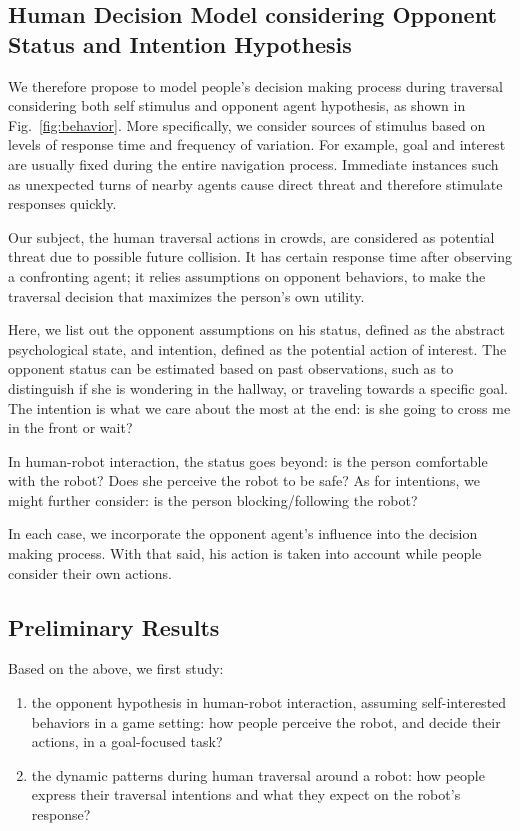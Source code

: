 \documentclass[conference]{IEEEtran}
\begin{document}
\subsection{Human Decision Model considering Opponent Status and Intention Hypothesis}
We therefore propose to model people's decision making process during 
traversal considering both self stimulus and opponent agent hypothesis, as 
shown in Fig.~\ref{fig:behavior}. More specifically, we consider sources of 
stimulus based on levels of response time and frequency of variation. For 
example, goal and interest are usually fixed during the entire navigation 
process. Immediate instances such as unexpected turns of nearby agents cause 
direct threat and therefore stimulate responses quickly.

Our subject, the human traversal actions in crowds, are considered as potential 
threat due to possible future collision. It has certain response time after 
observing a confronting agent; it relies assumptions on 
opponent behaviors, to make the traversal decision that maximizes the person's 
own utility. 

Here, we list out the opponent assumptions on his status, defined as the 
abstract psychological state, and intention, defined as the potential 
action of interest. The opponent status can be estimated based on past 
observations, such as to distinguish if she is wondering in the hallway, or 
traveling towards a specific goal. The intention is what we care about the most at 
the end: is she going to cross me in the front or wait?

In human-robot interaction, the status goes beyond: is the person comfortable 
with the robot? Does she perceive the robot 
to be safe? As for intentions, we might further consider: is the person 
blocking/following the robot? 

In each case, we incorporate the opponent agent's influence into the decision 
making process. With that said, his action is taken into account while people 
consider their own actions. 
\vspace{-.3em}
\subsection{Preliminary Results}
Based on the above, we first study:
\begin{enumerate}
\item the opponent hypothesis in human-robot interaction, assuming 
  self-interested behaviors in a game setting: how people perceive the robot, 
  and decide their actions, in a goal-focused task?
\item the dynamic patterns during human traversal around a robot: how people 
  express their traversal intentions and what they expect on the robot's 
  response?
\end{enumerate}
\end{document}
